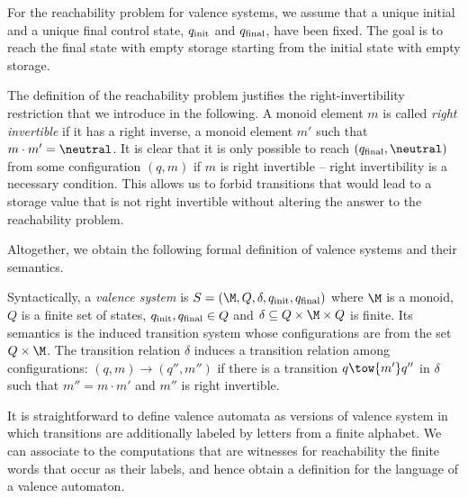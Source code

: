 \documentclass[../../diss.tex]{subfiles}
\begin{document}
For the reachability problem for valence systems, we assume that a unique initial and a unique final control state, $q_{\text{init}}$ and $q_{\text{final}}$, have been fixed.
The goal is to reach the final state with empty storage starting from the initial state with empty storage.

\begin{problem}
\end{problem}

The definition of the reachability problem justifies the right-invertibility restriction that we introduce in the following.
A monoid element $m$ is called \emph{right invertible} if it has a right inverse, a monoid element $m'$ such that $m \cdot m' = \neutral$.
It is clear that it is only possible to reach $(q_\final,\neutral)$ from some configuration $(q,m)$ if $m$ is right invertible -- right invertibility is a necessary condition.
This allows us to forbid transitions that would lead to a storage value that is not right invertible without altering the answer to the reachability problem.

Altogether, we obtain the following formal definition of valence systems and their semantics.

\begin{definition}
    Syntactically, a \emph{valence system} is \( \lts = (\monoid, Q, \delta, \qinit, \qfinal) \)
    where $\monoid$ is a monoid, $Q$ is a finite set of states, $q_{\text{init}}, q_{\text{final}} \in Q$ and $\delta \subseteq Q \times \monoid \times Q$ is finite.
    Its semantics is the induced transition system whose configurations are from the set $Q \times \monoid$.
    The transition relation $\delta$ induces a transition relation among configurations: $(q,m) \to (q'',m'')$ if there is a transition $q \tow{m'} q''$ in $\delta$ such that $m'' = m \cdot m'$ and $m''$ is right invertible.
\end{definition}

It is straightforward to define valence automata as versions of valence system in which transitions are additionally labeled by letters from a finite alphabet.
We can associate to the computations that are witnesses for reachability the finite words that occur as their labels, and hence obtain a definition for the language of a valence automaton.
\end{document}
